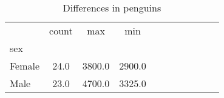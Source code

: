 \begin{table}
\centering
\caption{Differences in penguins}
\label{tab:features}
\begin{tabular}{lcccccccccc}
\toprule
{} &  count &     max &     min \\
sex    &        &         &         \\
\midrule
Female &   24.0 &  3800.0 &  2900.0 \\
Male   &   23.0 &  4700.0 &  3325.0 \\
\bottomrule
\end{tabular}
\end{table}
